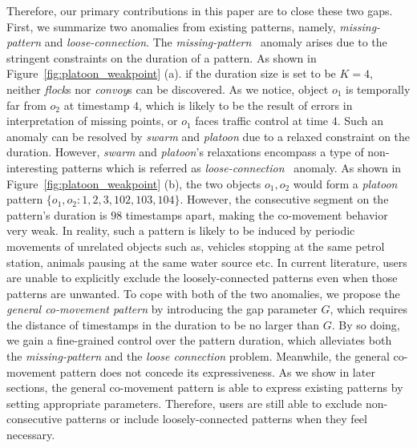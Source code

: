Therefore, our primary contributions in this paper are to close these two gaps. 
First, we summarize two anomalies from existing patterns, namely, \emph{missing-pattern} and \emph{loose-connection}.
The \emph{missing-pattern}~\cite{li2010swarm} anomaly arises due to the stringent constraints on the duration of a pattern. As shown in 
Figure~\ref{fig:platoon_weakpoint} (a). if the duration size is set to be $K=4$, neither \emph{flock}s nor \emph{convoy}s
can be discovered. As we notice, object $o_1$ is temporally far from $o_2$ at timestamp $4$, which is likely to be
the result of errors in interpretation of missing points, or $o_1$ faces traffic control at time $4$. Such an anomaly can
be resolved by \emph{swarm} and \emph{platoon} due to a relaxed constraint on the duration. However, 
\emph{swarm} and \emph{platoon}'s relaxations encompass a type of non-interesting patterns which is referred
as \emph{loose-connection}~\cite{li2015platoon} anomaly. As shown in Figure~\ref{fig:platoon_weakpoint} (b),
the two objects $o_1, o_2$ 
would form a \emph{platoon} pattern $\{o_1,o_2:1,2,3, 102,103,104\}$. However, the consecutive segment on the pattern's 
duration is $98$ timestamps apart, making the co-movement behavior very weak.
%
%
In reality, such a pattern is likely to be induced by periodic movements of unrelated objects such as, vehicles stopping at the same petrol station, animals pausing at the same water source etc. In current literature,
users are unable to explicitly exclude the loosely-connected patterns even when those patterns are unwanted.
To cope with both of the two anomalies, we propose the \emph{general co-movement pattern} 
by introducing the gap parameter $G$, which requires the distance of 
timestamps in the duration to be no larger than $G$. 
By so doing, we gain a fine-grained control over the pattern duration, which alleviates both the \emph{missing-pattern} and the \emph{loose connection} problem. Meanwhile, the general co-movement pattern does not concede its expressiveness. As we show in later sections, the general co-movement pattern is able to express existing patterns by setting appropriate parameters. Therefore, users are still able to exclude non-consecutive patterns 
or include loosely-connected patterns when they feel necessary.


